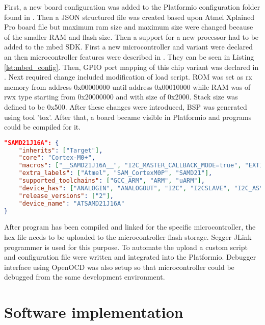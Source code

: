 First, a new board configuration was added to the Platformio configuration folder found in . Then a \ac{JSON} structured file was created based upon Atmel Xplained Pro board file but maximum ram size and maximum size were changed because of the smaller \ac{RAM} and flash size. Then a support for a new processor had to be added to the mbed \ac{SDK}. First a new microcontroller and variant were declared an then microcontroller features were described in . They can be seen in Listing \ref{lst:mbed_config}. Then, \ac{GPIO} port mapping of this chip variant was declared in . Next required change included modification of load script. \ac{ROM} was set as rx memory from address 0x00000000 until address 0x00010000 while \ac{RAM} was of rwx type starting from 0x20000000 and with size of 0x2000. Stack size was defined to be 0x500. After these changes were introduced, \ac{BSP} was generated using tool 'tox'. After that, a board became visible in Platformio and programs could be compiled for it.

\begin{lstlisting}[language=json,firstnumber=1,caption={Description of mbed features implemented in ATSAMD21J16},label={lst:mbed_config}]
"SAMD21J16A": {
    "inherits": ["Target"],
    "core": "Cortex-M0+",
    "macros": ["__SAMD21J16A__", "I2C_MASTER_CALLBACK_MODE=true", "EXTINT_CALLBACK_MODE=true", "USART_CALLBACK_MODE=true", "TC_ASYNC=true"],
    "extra_labels": ["Atmel", "SAM_CortexM0P", "SAMD21"],
    "supported_toolchains": ["GCC_ARM", "ARM", "uARM"],
    "device_has": ["ANALOGIN", "ANALOGOUT", "I2C", "I2CSLAVE", "I2C_ASYNCH", "INTERRUPTIN", "PORTIN", "PORTINOUT", "PORTOUT", "PWMOUT", "RTC", "SERIAL", "SERIAL_ASYNCH", "SERIAL_FC", "SLEEP", "SPI", "SPISLAVE", "SPI_ASYNCH"],
    "release_versions": ["2"],
    "device_name": "ATSAMD21J16A"
}
\end{lstlisting}

After program has been compiled and linked for the specific microcontroller, the hex file needs to be uploaded to the microcontroller flash storage. Segger JLink programmer is used for this purpose. To automate the upload a custom script and configuration file were written and integrated into the Platformio. Debugger interface using OpenOCD was also setup so that microcontroller could be debugged from the same development environment.


\section{Software implementation}

